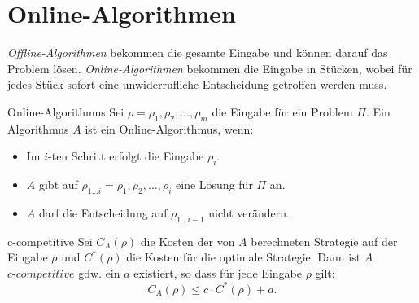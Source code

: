 \documentclass{panikzettel}
\begin{document}
\newpage
\section{Online-Algorithmen}
\emph{Offline-Algorithmen} bekommen die gesamte Eingabe und können darauf das Problem lösen. \emph{Online-Algorithmen} bekommen die Eingabe in Stücken, wobei für jedes Stück sofort eine unwiderrufliche Entscheidung getroffen werden muss.

\begin{halfboxl}
\vspace{-\baselineskip}
    \begin{defi}{Online-Algorithmus}
        Sei $\rho=\rho_1,\rho_2, \dots,\rho_m$ die Eingabe für ein Problem $\Pi$.
        Ein Algorithmus $A$ ist ein Online-Algorithmus, wenn:
        \begin{itemize}[nosep]
            \item Im $i$-ten Schritt erfolgt die Eingabe $\rho_i$.
            \item $A$ gibt auf $\rho_{1 \dots i} = \rho_1, \rho_2, \dots, \rho_i$ eine Lösung für $\Pi$ an.
            \item $A$ darf die Entscheidung auf $\rho_{1 \dots i-1}$ nicht verändern.
        \end{itemize}
    \end{defi}
\end{halfboxl}%
\begin{halfboxr}
\vspace{-\baselineskip}
    \begin{defi}{c-competitive}
        Sei $C_A(\rho)$ die Kosten der von $A$ berechneten Strategie auf der Eingabe $\rho$ und $C^*(\rho)$ die Kosten für die optimale Strategie. Dann ist $A$ $\textit{c-competitive}$ gdw. ein $a$ existiert, so dass für jede Eingabe $\rho$ gilt: $$C_A(\rho) \leq c \cdot C^*(\rho)+a.$$
    \end{defi}
\end{halfboxr}
\end{document}
